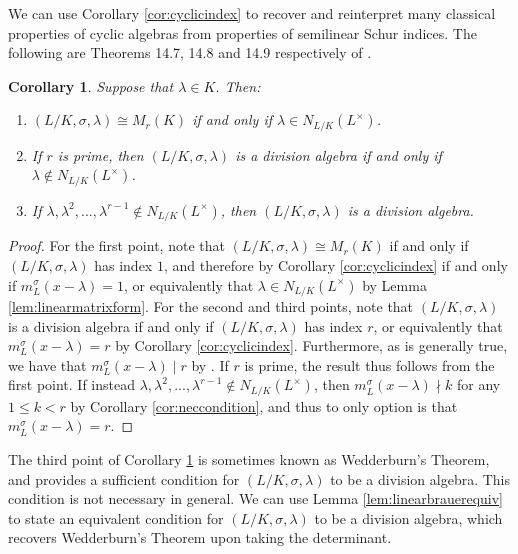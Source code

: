 \documentclass[10pt, reqno, hidelinks]{amsart}
\numberwithin{thm}{subsection}
\newtheorem{cor}[thm]{Corollary}
\theoremstyle{definition}
\begin{document}
We can use Corollary \ref{cor:cyclicindex} to recover and reinterpret many classical properties of cyclic algebras from properties of semilinear Schur indices. The following are Theorems 14.7, 14.8 and 14.9 respectively of \cite{LAM}.

\begin{cor}\label{cor:cyclicalgproperties}
    Suppose that $\lambda \in K$. Then:
    \begin{enumerate}
        \item $(L/K,  \sigma, \lambda) \cong M_r(K)$ if and only if $\lambda \in N_{L/K}(L^{\times})$.
        \item If $r$ is prime, then $(L/K, \sigma,  \lambda)$ is a division algebra if and only if $\lambda \not\in N_{L/K}(L^{\times})$.
        \item If $\lambda, \lambda^2, ... ,\lambda^{r-1} \not\in N_{L/K}(L^{\times})$, then $(L/K,  \sigma, \lambda)$ is a division algebra.
    \end{enumerate}
\end{cor}

\begin{proof}
        For the first point, note that $(L/K,  \sigma, \lambda) \cong M_r(K)$ if and only if $(L/K,  \sigma, \lambda)$ has index $1$, and therefore by Corollary \ref{cor:cyclicindex} if and only if $m_L^{\sigma}(x - \lambda) = 1$, or equivalently that $\lambda \in N_{L/K}(L^{\times})$ by Lemma \ref{lem:linearmatrixform}. For the second and third points, note that $(L/K,  \sigma, \lambda)$ is a division algebra if and only if $(L/K,  \sigma, \lambda)$ has index $r$, or equivalently that $m_L^{\sigma}(x - \lambda) = r$ by Corollary \ref{cor:cyclicindex}. Furthermore, as is generally true, we have that $m_L^{\sigma}(x - \lambda) \mid r$ by \cite[Prop.\ 9.3(6)]{TAYSchur}. If $r$ is prime, the result thus follows from the first point. If instead $\lambda, \lambda^2, ... ,\lambda^{r-1} \not\in N_{L/K}(L^{\times})$, then $m_L^{\sigma}(x - \lambda) \nmid k$ for any $1 \leq k < r$ by Corollary \ref{cor:neccondition}, and thus to only option is that $m_L^{\sigma}(x - \lambda) = r$.
\end{proof}

The third point of Corollary \ref{cor:cyclicalgproperties} is sometimes known as Wedderburn's Theorem, and provides a sufficient condition for $(L/K,  \sigma, \lambda)$ to be a division algebra. This condition is not necessary in general. We can use Lemma \ref{lem:linearbrauerequiv} to state an equivalent condition for $(L/K,  \sigma, \lambda)$ to be a division algebra, which recovers Wedderburn's Theorem upon taking the determinant.
\end{document}
